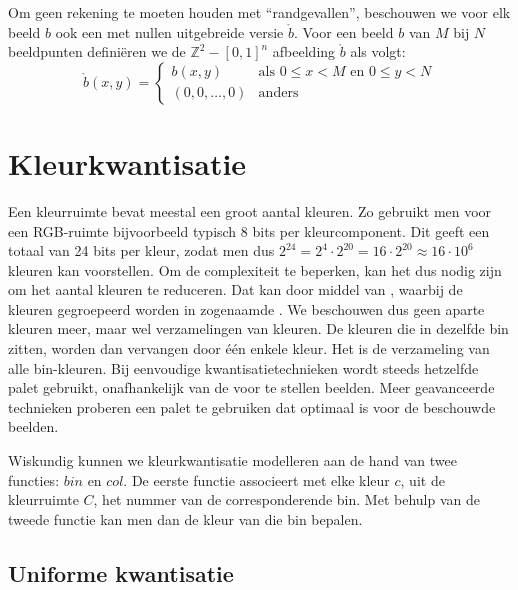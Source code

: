 Om geen rekening te moeten houden met ``randgevallen'', beschouwen we voor elk beeld $b$ ook een
met nullen uitgebreide versie $\mathring{b}$. Voor een beeld $b$ van $M$ bij $N$ beeldpunten
defini\"eren we de $\mathbb{Z}^2 - [0,1]^n$ afbeelding $\mathring{b}$ als volgt:
\begin{displaymath}
\mathring{b}(x,y) = \begin{cases}
b(x,y) & \textrm{als } 0 \le x < M \textrm{ en } 0 \le y < N \\
(0,0,\ldots,0) & \textrm{anders}
\end{cases}
\end{displaymath}

\section{Kleurkwantisatie}
\label{sectie:kleurkwantisatie}

Een kleurruimte bevat meestal een groot aantal 
kleuren. Zo gebruikt men voor een RGB-ruimte bijvoorbeeld typisch 8 bits per 
kleurcomponent. Dit geeft een totaal van 24 bits per kleur, zodat men dus 
$2^{24}=2^4 \cdot 2^{20}=16 \cdot 2^{20} \approx 16 \cdot 10^6$ kleuren kan 
voorstellen.
Om de complexiteit te beperken, kan het dus nodig zijn om het aantal kleuren te 
reduceren. Dat kan door middel van , waarbij de kleuren 
gegroepeerd worden in
zogenaamde . We beschouwen dus geen aparte kleuren meer, maar wel 
verzamelingen van kleuren. De kleuren die in dezelfde bin zitten, worden dan 
vervangen door \'e\'en enkele kleur. Het  is de verzameling 
van alle bin-kleuren. Bij eenvoudige kwantisatietechnieken wordt steeds 
hetzelfde palet gebruikt, onafhankelijk van de voor te stellen beelden. Meer 
geavanceerde technieken proberen een palet te gebruiken dat optimaal is voor de 
beschouwde beelden.

Wiskundig kunnen we kleurkwantisatie modelleren aan de hand van twee functies: 
$bin$ en $col$. De eerste functie associeert met elke kleur $c$, uit de 
kleurruimte $C$, het nummer van de corresponderende bin. Met behulp van de 
tweede functie kan men dan de kleur van die bin bepalen.

\subsection{Uniforme kwantisatie}

